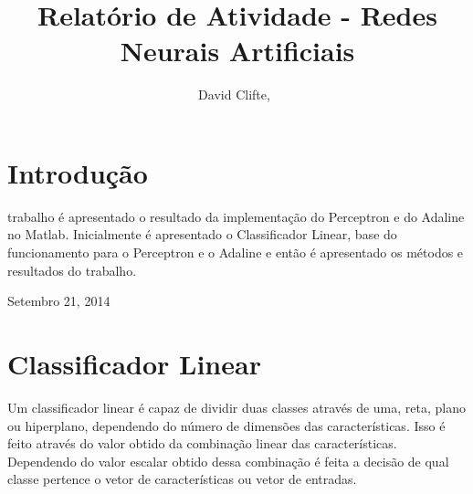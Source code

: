 \documentclass[12pt,journal,onecolumn]{IEEEtran}
\begin{document}
%
\title{Relatório de Atividade - Redes Neurais Artificiais}

\author{David Clifte,~
}



\maketitle

%
\IEEEpeerreviewmaketitle



\section{Introdução}
% 
% 
% 
% 
 trabalho é apresentado o resultado da implementação do
Perceptron e do Adaline no Matlab. Inicialmente é apresentado o Classificador
Linear, base do funcionamento para o Perceptron e o Adaline e então é
apresentado os métodos e resultados do trabalho.

\hfill Setembro 21, 2014


\section{Classificador Linear}
Um classificador linear é capaz de dividir duas classes através de uma, reta,
plano ou hiperplano, dependendo do número de dimensões das características.
Isso é feito através do valor obtido da combinação linear das características.
Dependendo do valor escalar obtido dessa combinação é feita a decisão de qual 
classe pertence o vetor de características ou vetor de entradas.
\end{document}
